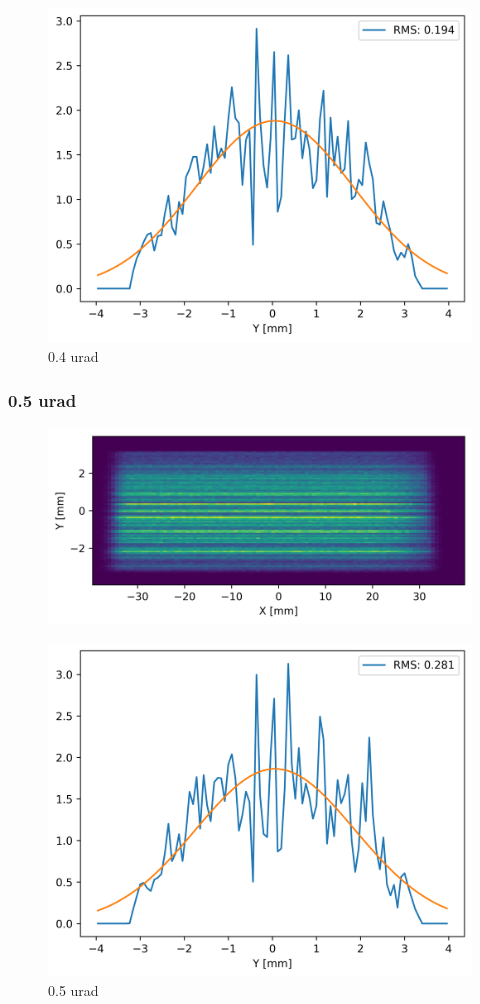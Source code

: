 \begin{figure}[H]
\centering
\includegraphics[width=0.9\linewidth]{./../figures/slope_error/WB4C_d30_d-spacing_gradient_45keV_slope_error04urad_ESRFID19PW150_Yprofile.png}
\caption{0.4 urad}
\label{fig:04urad}
\end{figure}

\clearpage
\subsubsection{0.5 urad}
\begin{figure}[H]
\centering
\includegraphics[width=0.9\linewidth]{./../figures/slope_error/WB4C_d30_d-spacing_gradient_45keV_slope_error05urad.png}
\end{figure}

\begin{figure}[H]
\centering
\includegraphics[width=0.9\linewidth]{./../figures/slope_error/WB4C_d30_d-spacing_gradient_45keV_slope_error05urad_ESRFID19PW150_Yprofile.png}
\caption{0.5 urad}
\label{fig:05urad}
\end{figure}
